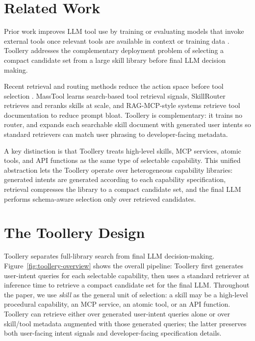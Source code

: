 \documentclass[11pt]{article}
\begin{document}
\section{Related Work}

Prior work improves LLM tool use by training or evaluating models that invoke external tools once relevant tools are available in context or training data \citep{yao2022webshop, schick2023toolformer, patil2024gorilla, qin2023toolllm, li-etal-2023-api, patilberkeley}. Toollery addresses the complementary deployment problem of selecting a compact candidate set from a large skill library before final LLM decision making.

Recent retrieval and routing methods reduce the action space before tool selection \citep{agarwal2025toolrm, lin2025masstool, zheng2026skillrouter, gan2025rag, paramanayakam2025less}. MassTool learns search-based tool retrieval signals, SkillRouter retrieves and reranks skills at scale, and RAG-MCP-style systems retrieve tool documentation to reduce prompt bloat. Toollery is complementary: it trains no router, and expands each searchable skill document with generated user intents so standard retrievers can match user phrasing to developer-facing metadata.

A key distinction is that Toollery treats high-level skills, MCP services, atomic tools, and API functions as the same type of selectable capability. This unified abstraction lets the Toollery operate over heterogeneous capability libraries: generated intents are generated according to each capability specification, retrieval compresses the library to a compact candidate set, and the final LLM performs schema-aware selection only over retrieved candidates.

\section{The Toollery Design}
\label{sec:method}

Toollery separates full-library search from final LLM decision-making. Figure~\ref{fig:toollery-overview} shows the overall pipeline: Toollery first generates user-intent queries for each selectable capability, then uses a standard retriever at inference time to retrieve a compact candidate set for the final LLM. Throughout the paper, we use \emph{skill} as the general unit of selection: a skill may be a high-level procedural capability, an MCP service, an atomic tool, or an API function. Toollery can retrieve either over generated user-intent queries alone or over skill/tool metadata augmented with those generated queries; the latter preserves both user-facing intent signals and developer-facing specification details.
\end{document}
